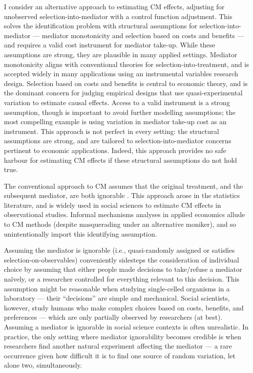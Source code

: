 I consider an alternative approach to estimating CM effects, adjusting for unobserved selection-into-mediator with a control function adjustment.
This solves the identification problem with structural assumptions for selection-into-mediator --- mediator monotonicity and selection based on costs and benefits --- and requires a valid cost instrument for mediator take-up.
While these assumptions are strong, they are plausible in many applied settings.
Mediator monotonicity aligns with conventional theories for selection-into-treatment, and is accepted widely in many applications using an instrumental variables research design.
Selection based on costs and benefits is central to economic theory, and is the dominant concern for judging empirical designs that use quasi-experimental variation to estimate causal effects.
Access to a valid instrument is a strong assumption, though is important to avoid further modelling assumptions; the most compelling example is using variation in mediator take-up cost as an instrument.
This approach is not perfect in every setting: the structural assumptions are strong, and are tailored to selection-into-mediator concerns pertinent to economic applications.
Indeed, this approach provides no safe harbour for estimating CM effects if these structural assumptions do not hold true.

The conventional approach to CM assumes that the original treatment, and the subsequent mediator, are both ignorable \citep{imai2010identification}.
This approach arose in the statistics literature, and is widely used in social sciences to estimate CM effects in observational studies.
Informal mechanisms analyses in applied economics allude to CM methods (despite masquerading under an alternative moniker), and so unintentionally import this identifying assumption.

Assuming the mediator is ignorable (i.e., quasi-randomly assigned or satisfies selection-on-observables) 
conveniently sidesteps the consideration of individual choice by assuming that either people made decisions to take/refuse a mediator na\"ively, or a researcher controlled for everything relevant to this decision.
This assumption might be reasonable when studying single-celled organisms in a laboratory --- their ``decisions'' are simple and mechanical.
Social scientists, however, study humans who make complex choices based on costs, benefits, and preferences --- which are only partially observed by researchers (at best).
Assuming a mediator is ignorable in social science contexts is often unrealistic.
In practice, the only setting where mediator ignorability becomes credible is when researchers find another natural experiment affecting the mediator --- a rare occurrence given how difficult it is to find one source of random variation, let alone two, simultaneously.

